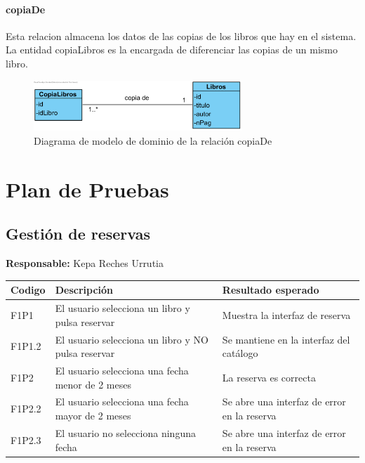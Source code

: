 ﻿\documentclass{report}
\begin{document}
                \subsubsection{copiaDe}
                    Esta relacion almacena los datos de las copias de los libros que hay en el sistema. La entidad copiaLibros es la encargada de diferenciar las copias de un mismo libro.
                    \begin{figure}[H]
                        \centering
                        \includegraphics[width=0.7\textwidth]{img/dominio/copiaDe.png}
                        \caption{Diagrama de modelo de dominio de la relación copiaDe}
                    \end{figure}
    \chapter{Plan de Pruebas}
        \section{Gestión de reservas}
            \begin{center}
                \textbf{Responsable:} Kepa Reches Urrutia\\
                \begin{longtable}{|m{2cm}|m{4cm}|m{4cm}|}
                    \hline
                    Codigo & Descripción & Resultado esperado \\
                    \hline
                    \endhead \hline
                    F1P1 & El usuario selecciona un libro y pulsa reservar & Muestra la interfaz de reserva  \\
                    \hline
                    F1P1.2 & El usuario selecciona un libro y NO pulsa reservar  & Se mantiene en la interfaz del catálogo  \\
                    \hline
                    F1P2 & El usuario selecciona una fecha menor de 2 meses & La reserva es correcta  \\
                    \hline
                    F1P2.2 & El usuario selecciona una fecha mayor de 2 meses &  Se abre una interfaz de error en la reserva \\
                    \hline
                    F1P2.3 & El usuario no selecciona ninguna fecha & Se abre una interfaz de error en la reserva   \\
                    \hline          
                \end{longtable}
            \end{center}
            \clearpage
\end{document}
